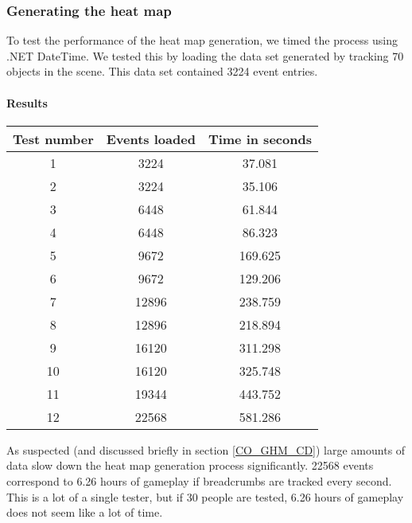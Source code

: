 \subsubsection{Generating the heat map}
\label{Test_P_Generating}
To test the performance of the heat map generation, we timed the process using .NET DateTime. We tested this by loading the data set generated by tracking 70 objects in the scene. This data set contained 3224 event entries.

\paragraph{Results}
\begin{center}
\begin{tabular}{| c | c | c |}
\hline
Test number & Events loaded & Time in seconds \\ 
\hline
1 & 3224 & 37.081 \\ 
\hline
2 & 3224 & 35.106 \\ 
\hline
3 & 6448 & 61.844 \\ 
\hline
4 & 6448 & 86.323 \\ 
\hline
5 & 9672 & 169.625 \\
\hline
6 & 9672 &  129.206 \\
\hline
7 & 12896 & 238.759 \\
\hline
8 & 12896 & 218.894 \\
\hline
9 & 16120 & 311.298 \\
\hline
10 & 16120 & 325.748 \\
\hline
11 & 19344 & 443.752 \\
\hline 
12 & 22568 & 581.286 \\
\hline
\end{tabular}
\end{center}
As suspected (and discussed briefly in section \ref{CO_GHM_CD}) large amounts of data slow down the heat map generation process significantly. 22568 events correspond to 6.26 hours of gameplay if breadcrumbs are tracked every second. This is a lot of a single tester, but if 30 people are tested, 6.26 hours of gameplay does not seem like a lot of time.